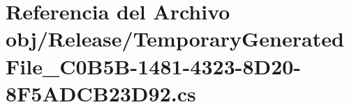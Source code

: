 \hypertarget{Release_2TemporaryGeneratedFile__036C0B5B-1481-4323-8D20-8F5ADCB23D92_8cs}{}\section{Referencia del Archivo obj/\+Release/\+Temporary\+Generated\+File\+\_\+C0\+B5\+B-\/1481-\/4323-\/8\+D20-\/8\+F5\+A\+D\+C\+B23\+D92.cs}
\label{Release_2TemporaryGeneratedFile__036C0B5B-1481-4323-8D20-8F5ADCB23D92_8cs}
